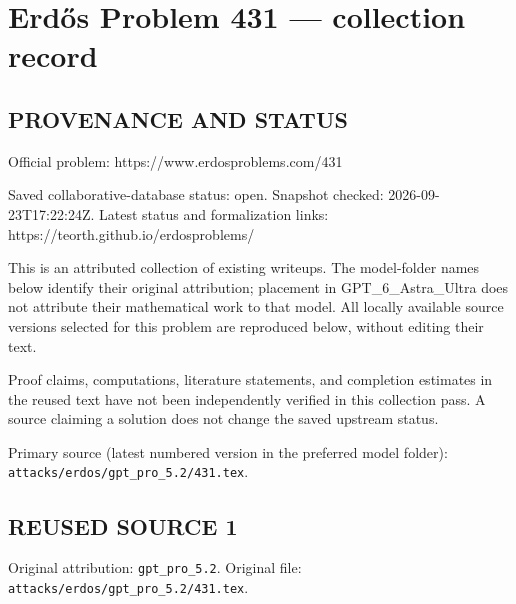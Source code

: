 \section*{Erd\H{o}s Problem 431 --- collection record}

\subsection*{PROVENANCE AND STATUS}
Official problem: https://www.erdosproblems.com/431

Saved collaborative-database status: open.
Snapshot checked: 2026-09-23T17:22:24Z.
Latest status and formalization links: https://teorth.github.io/erdosproblems/

This is an attributed collection of existing writeups. The model-folder names below identify their original attribution; placement in GPT\_6\_Astra\_Ultra does not attribute their mathematical work to that model. All locally available source versions selected for this problem are reproduced below, without editing their text.

Proof claims, computations, literature statements, and completion estimates in the reused text have not been independently verified in this collection pass. A source claiming a solution does not change the saved upstream status.

Primary source (latest numbered version in the preferred model folder): \texttt{attacks/erdos/gpt\_pro\_5.2/431.tex}.

\subsection*{REUSED SOURCE 1}
Original attribution: \texttt{gpt\_pro\_5.2}.
Original file: \texttt{attacks/erdos/gpt\_pro\_5.2/431.tex}.


